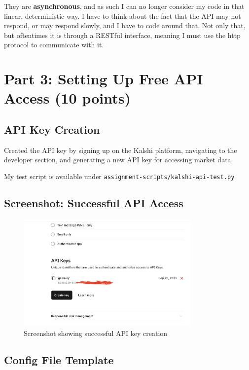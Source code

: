 \documentclass[12pt,a4paper]{article}
\begin{document}
They are \textbf{asynchronous}, and as such I can no longer consider my code in that linear, deterministic way. I have to think about the fact that the API may not respond, or may respond slowly, and I have to code around that. Not only that, but oftentimes it is through a RESTful interface, meaning I must use the http protocol to communicate with it.


\section{Part 3: Setting Up Free API Access (10 points)}

\subsection{API Key Creation}

Created the API key by signing up on the Kalshi platform, navigating to the developer section, and generating a new API key for accessing market data.

My test script is available under \texttt{assignment-scripts/kalshi-api-test.py}

\subsection{Screenshot: Successful API Access}

\begin{figure}[h]
  \centering
  \includegraphics[width=0.8\textwidth]{media/key_creation.png}
  \caption{Screenshot showing successful API key creation}
  \label{fig:api_setup}
\end{figure}

\subsection{Config File Template}
\end{document}
